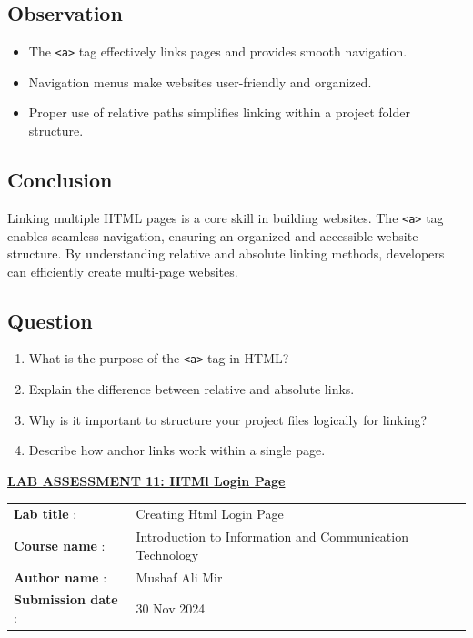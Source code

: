 \documentclass[a4paper,9pt]{article}
\begin{document}
\subsection{Observation}
\begin{itemize}
	\item The \texttt{\textless a\textgreater} tag effectively links pages and provides smooth navigation.
	
	
	\item Navigation menus make websites user-friendly and organized.
	\item Proper use of relative paths simplifies linking within a project folder structure.
\end{itemize}
\subsection{Conclusion}
Linking multiple HTML pages is a core skill in building websites. The \texttt{\textless a\textgreater} tag enables seamless navigation, ensuring an organized and accessible website structure. By understanding relative and absolute linking methods, developers can efficiently create multi-page websites.

\subsection{Question}

\begin{enumerate}
	\item What is the purpose of the \texttt{\textless a\textgreater} tag in HTML?
	
	\item Explain the difference between relative and absolute links.
	
	\item Why is it important to structure your project files logically for linking?
	
	\item Describe how anchor links work within a single page.
	
\end{enumerate}

\newpage


\begin{center}
	{\Huge \bfseries \underline{ LAB ASSESSMENT 11: HTMl Login Page } \par}
\end{center}
\noindent\begin{tabular}{@{}ll}
	\textbf{Lab title} :& Creating Html Login Page \\
	\textbf{Course name} :&  Introduction to Information and Communication Technology\\
	\textbf{Author name} : & Mushaf Ali Mir\\
	\textbf{Submission date} :& 30 Nov 2024 \\
\end{tabular}
\end{document}
